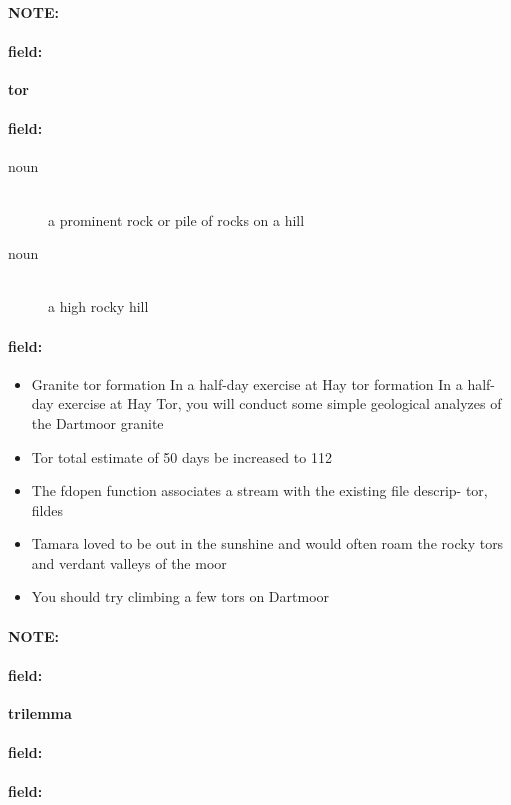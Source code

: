 \documentclass[12pt]{article}
\newenvironment{note}{\paragraph{NOTE:}}{}
\newenvironment{field}{\paragraph{field:}}{}
\begin{document}
\begin{note}
\begin{field}
\textbf{\large tor}
\end{field}


\begin{field}
\begin{description}
\item[noun] \hfill \\ 
a prominent rock or pile of rocks on a hill

\item[noun] \hfill \\ 
a high rocky hill

\end{description}
\end{field}

\begin{field}
\begin{itemize}
\item Granite tor formation In a half-day exercise at Hay tor formation In a half-day exercise at Hay Tor, you will conduct some simple geological analyzes of the Dartmoor granite
\item Tor total estimate of 50 days be increased to 112
\item The fdopen function associates a stream with the existing file descrip- tor, fildes
\item Tamara loved to be out in the sunshine and would often roam the rocky tors and verdant valleys of the moor
\item You should try climbing a few tors on Dartmoor
\end{itemize}
\end{field}
\end{note}
\begin{note}
\begin{field}
\textbf{\large trilemma}
\end{field}


\begin{field}
\end{field}

\begin{field}
\end{field}
\end{note}
\end{document}
